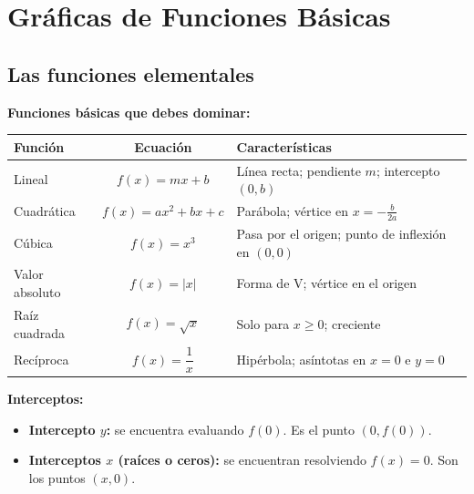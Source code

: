 \documentclass[12pt, letterpaper]{article}
\begin{document}
\newpage


\section{Gráficas de Funciones Básicas}

\subsection{Las funciones elementales}

\begin{cuadroteoria}
  \textbf{Funciones básicas que debes dominar:}

  \begin{center}
    \begin{tabular}{l c p{7.2cm}}
      \toprule
      \textbf{Función} & \textbf{Ecuación}      & \textbf{Características}                          \\
      \midrule
      Lineal           & $f(x) = mx + b$        & Línea recta; pendiente $m$; intercepto $(0, b)$   \\
      Cuadrática       & $f(x) = ax^2 + bx + c$ & Parábola; vértice en $x = -\frac{b}{2a}$          \\
      Cúbica           & $f(x) = x^3$           & Pasa por el origen; punto de inflexión en $(0,0)$ \\
      Valor absoluto   & $f(x) = |x|$           & Forma de V; vértice en el origen                  \\
      Raíz cuadrada    & $f(x) = \sqrt{x}$      & Solo para $x \geq 0$; creciente                   \\
      Recíproca        & $f(x) = \dfrac{1}{x}$  & Hipérbola; asíntotas en $x = 0$ e $y = 0$         \\
      \bottomrule
    \end{tabular}
  \end{center}
\end{cuadroteoria}

\begin{cuadrosolucion}
  \textbf{Interceptos:}
  \begin{itemize}[leftmargin=*]
    \item \textbf{Intercepto $y$:} se encuentra evaluando $f(0)$. Es el punto $(0, f(0))$.
    \item \textbf{Interceptos $x$ (raíces o ceros):} se encuentran resolviendo $f(x) = 0$. Son los puntos $(x, 0)$.
  \end{itemize}
\end{cuadrosolucion}
\end{document}
